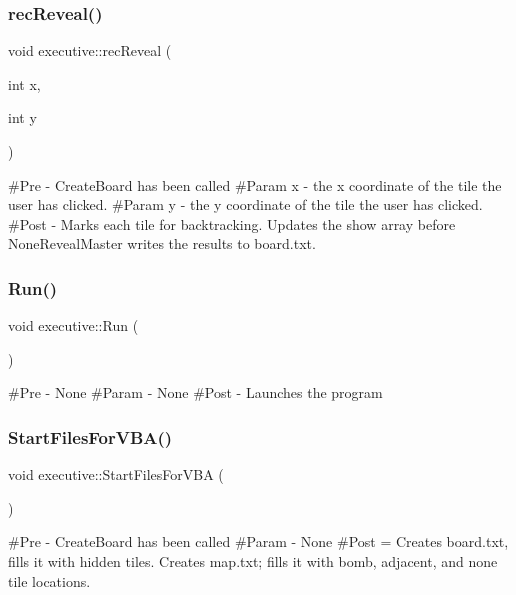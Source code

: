 \subsubsection{\texorpdfstring{recReveal()}{recReveal()}}
{\footnotesize\ttfamily void executive\+::rec\+Reveal (\begin{DoxyParamCaption}\item[{int}]{x,  }\item[{int}]{y }\end{DoxyParamCaption})}

\#\+Pre -\/ Create\+Board has been called \#\+Param x -\/ the x coordinate of the tile the user has clicked. \#\+Param y -\/ the y coordinate of the tile the user has clicked. \#\+Post -\/ Marks each tile for backtracking. Updates the show array before None\+Reveal\+Master writes the results to board.\+txt. \mbox{\label{classexecutive_a979d10f76a13e75a3d003fcbd7d224ad}} 
\subsubsection{\texorpdfstring{Run()}{Run()}}
{\footnotesize\ttfamily void executive\+::\+Run (\begin{DoxyParamCaption}{ }\end{DoxyParamCaption})}

\#\+Pre -\/ None \#\+Param -\/ None \#\+Post -\/ Launches the program \mbox{\label{classexecutive_a29514ae2f55a8f5f951566d1520ed5d8}} 
\subsubsection{\texorpdfstring{StartFilesForVBA()}{StartFilesForVBA()}}
{\footnotesize\ttfamily void executive\+::\+Start\+Files\+For\+V\+BA (\begin{DoxyParamCaption}{ }\end{DoxyParamCaption})}

\#\+Pre -\/ Create\+Board has been called \#\+Param -\/ None \#\+Post = Creates board.\+txt, fills it with hidden tiles. Creates map.\+txt; fills it with bomb, adjacent, and none tile locations. \mbox{\label{classexecutive_a19c71fe2ec927ef624ef9dfb155fccc9}} 
